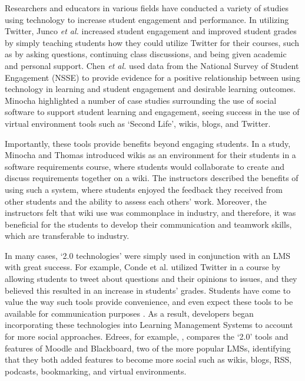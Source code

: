 Researchers and educators in various fields have conducted a variety of studies using technology to increase student engagement and performance. In utilizing Twitter, Junco \textit{et al.} \cite{junco2011effect} increased student engagement and improved student grades by simply teaching students how they could utilize Twitter for their courses, such as by asking questions, continuing class discussions, and being given academic and personal support. Chen \textit{et al.} \cite{chen2010engaging} used data from the National Survey of Student Engagement (NSSE) to provide evidence for a positive relationship between using technology in learning and student engagement and desirable learning outcomes. Minocha \cite{minocha2009study} highlighted a number of case studies surrounding the use of social software to support student learning and engagement, seeing success in the use of virtual environment tools such as `Second Life', wikis, blogs, and Twitter.

Importantly, these tools provide benefits beyond engaging students. In a study, Minocha and Thomas \cite{minocha2007collaborative} introduced wikis as an environment for their students in a software requirements course, where students would collaborate to create and discuss requirements together on a wiki. The instructors described the benefits of using such a system, where students enjoyed the feedback they received from other students and the ability to assess each others' work. Moreover, the instructors felt that wiki use was commonplace in industry, and therefore, it was beneficial for the students to develop their communication and teamwork skills, which are transferable to industry.

In many cases, `2.0 technologies' were simply used in conjunction with an LMS with great success. For example, Conde et al. \cite{conde2014evolving} utilized Twitter in a course by allowing students to tweet about questions and their opinions to issues, and they believed this resulted in an increase in students' grades. Students have come to value the way such tools provide convenience, and even expect these tools to be available for communication purposes \cite{caruso2007ecar}. As a result, developers began incorporating these technologies into Learning Management Systems to account for more social approaches. Edrees, for example, \cite{edrees2013elearning}, compares the `2.0' tools and features of Moodle and Blackboard, two of the more popular LMSs, identifying that they both added features to become more social such as wikis, blogs, RSS, podcasts, bookmarking, and virtual environments.

